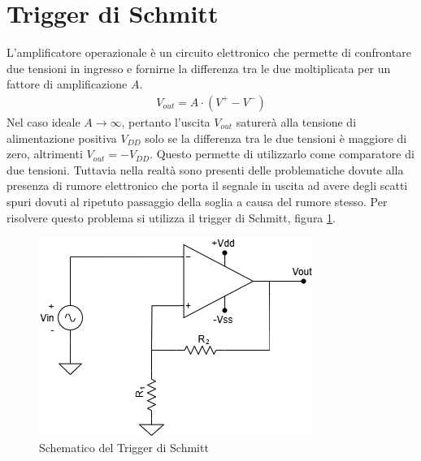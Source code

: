 \documentclass[a4paper,12pt]{article}
\begin{document}


\section*{Trigger di Schmitt}
L'amplificatore operazionale è un circuito elettronico che permette di confrontare due tensioni in ingresso e fornirne la differenza tra le due moltiplicata per un fattore di amplificazione $A$.
\begin{align*}
	V_{out} = A \cdot (V^+ - V^-)
\end{align*}
Nel caso ideale $ A \rightarrow \infty $, pertanto l'uscita $V_{out}$ saturerà alla tensione di alimentazione positiva $V_{DD}$ solo se la differenza tra le due tensioni è maggiore di zero, altrimenti $V_{out} = -V_{DD}$.
Questo permette di utilizzarlo come comparatore di due tensioni. Tuttavia nella realtà sono presenti delle problematiche dovute alla presenza di rumore elettronico che porta il segnale in uscita ad avere degli scatti spuri dovuti al ripetuto passaggio della soglia a causa del rumore stesso.
Per risolvere questo problema si utilizza il trigger di Schmitt, figura \ref{fig:trigger_schmitt}.

\begin{figure}[h]
	\centering
	\includegraphics[width = 0.55\linewidth]{./immagini/schmitt/circuito.png}
	\caption{Schematico del Trigger di Schmitt}
	\label{fig:trigger_schmitt}
\end{figure}
\end{document}

